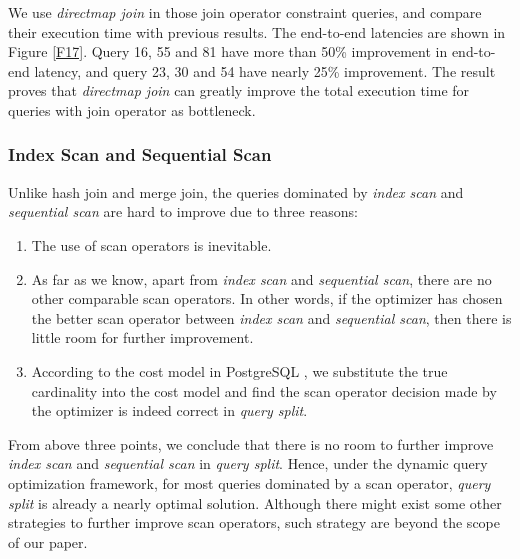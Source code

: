         We use \textit{directmap join} in those join operator constraint queries, and compare their execution time with previous results. The end-to-end latencies are shown in Figure \ref{F17}. Query 16, 55 and 81 have more than 50\% improvement in end-to-end latency, and query 23, 30 and 54 have nearly 25\% improvement. The result proves that \textit{directmap join} can greatly improve the total execution time for queries with join operator as bottleneck.
        

    \subsubsection{Index Scan and Sequential Scan}
        Unlike hash join and merge join, the queries dominated by \textit{index scan} and \textit{sequential scan} are hard to improve due to three reasons:
        \begin{enumerate}[leftmargin = 15pt]
            \renewcommand{\labelenumi}{\theenumi.}
            \item The use of scan operators is inevitable. 
            \item As far as we know, apart from \textit{index scan} and \textit{sequential scan}, there are no other comparable scan operators. In other words, if the optimizer has chosen the better scan operator between \textit{index scan} and \textit{sequential scan}, then there is little room for further improvement. 
            \item According to the cost model in PostgreSQL \cite{manual2}, we substitute the true cardinality into the cost model and find the scan operator decision made by the optimizer is indeed correct in \textit{query split}.
        \end{enumerate}\par
        From above three points, we conclude that there is no room to further improve \textit{index scan} and \textit{sequential scan} in \textit{query split}. Hence, under the dynamic query optimization framework, for most queries dominated by a scan operator, \textit{query split} is already a nearly optimal solution. Although there might exist some other strategies to further improve scan operators, such strategy are beyond the scope of our paper.